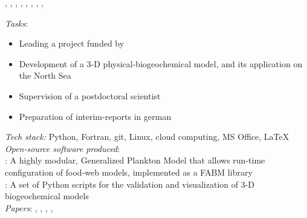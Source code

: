 \documentclass[
	a4paper,
]{fortysecondscv}
\begin{document}
\begin{cvtable}[1.0]
{      \href{https://doi.org/10.1111/ele.13680}{\color{pblue}{2}},  %
      \href{https://doi.org/10.5194/gmd-14-6025-2021}{\color{pblue}{3}}, %
      \href{https://doi.org/10.3389/fmars.2021.675428}{\color{pblue}{4}}, %
      \href{https://doi.org/10.1002/lno.12005}{\color{pblue}{5}}, %
      \href{https://doi.org/10.3389/fmars.2022.975414}{\color{pblue}{6}}, %
      \href{https://doi.org/10.1016/j.scitotenv.2022.158757}{\color{pblue}{7}}, %
      \href{https://ospar.org/documents?v=48846}{\color{pblue}{8}}, %
      \href{https://doi.org/10.5194/gmd-16-95-2023}{\color{pblue}{9}}, %
      \href{https://doi.org/10.1101/2022.05.18.492269}{\color{pblue}{10}} %
    }
    
	{\href{https://www.hereon.de/}{\color{pblue}{Helmholtz-Zentrum Hereon, Germany}}}
	{\textit{Tasks}:
	\begin{itemize}[topsep=0pt,itemsep=0pt,partopsep=0pt, parsep=0pt, leftmargin=*]
     \item Leading a project funded by \href{https://www.umweltbundesamt.de/en}{\color{blue}{UBA}}
        \item Development of a 3-D physical-biogeochemical model, and its application on the North Sea
        \item Supervision of a postdoctoral scientist
        \item Preparation of interim-reports in german
    \end{itemize}
      \textit{Tech stack:} Python, Fortran, git, Linux, cloud computing, MS Office, \LaTeX\\
      \textit{Open-source software produced}:\\
      \href{https://github.com/OnurKerimoglu/FABM-GPM}{\color{pblue}{FABM-GPM}}: A highly modular,  Generalized Plankton Model that allows run-time configuration of food-web models, implemented as a FABM library\\
      \href{git@github.com:OnurKerimoglu/3Dval.git}{\color{pblue}{3Dval}}: A set of Python scripts for the validation and visualization of 3-D biogeochemical models\\
      \textit{Papers}:
      \href{https://doi.org/10.3389/fmars.2019.00370}{\color{pblue}{1}}, 
      \href{https://doi.org/10.1029/2019JC015987}{\color{pblue}{2}}, 
      \href{https://doi.org/10.5194/bg-17-5097-2020}{\color{pblue}{3}}, 
      \href{https://doi.org/10.3389/fmars.2021.596126}{\color{pblue}{4}}, 
      \href{https://doi.org/10.3389/fmars.2021.637483}{\color{pblue}{5}}
      }
\end{cvtable}
\end{document}
